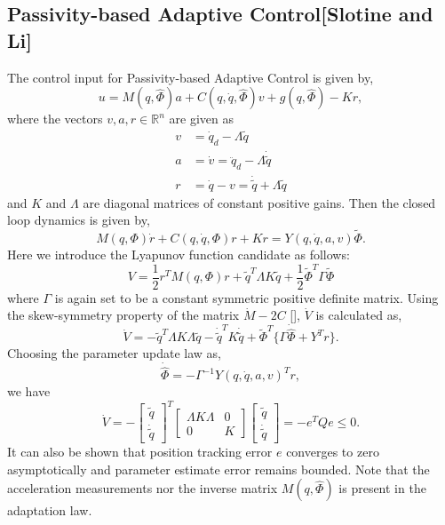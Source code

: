 \documentclass[Afour,sageh,times]{sagej}
\begin{document}
\subsection{Passivity-based Adaptive Control[Slotine and Li]}
The control input for Passivity-based Adaptive Control is given by,
\begin{equation*}
u = M(q,\hat{\Phi})a + C(q,\dot{q},\hat{\Phi})v + g(q,\hat{\Phi})-Kr,
\end{equation*}
where the vectors $v,a,r\in\mathbb{R}^{n}$ are given as
\begin{align*}
v &= \dot{q}_{d}-\Lambda\tilde{q}\\
a &= \dot{v} = \ddot{q}_{d}-\Lambda\dot{\tilde{q}}\\
r &= \dot{q}-v = \dot{\tilde{q}}+\Lambda\tilde{q}
\end{align*}
and $K$ and $\Lambda$ are diagonal matrices of constant positive gains. Then the closed loop dynamics is given by,
\begin{equation*}
M(q,\Phi)\dot{r} + C(q,\dot{q},\Phi)r+Kr = Y(q,\dot{q},a,v)\tilde{\Phi}.
\end{equation*}
Here we introduce the Lyapunov function candidate as follows:
\begin{equation}
V = \frac{1}{2}r^{T}M(q,\Phi)r + \tilde{q}^{T}\Lambda K\tilde{q}+\frac{1}{2}\tilde{\Phi}^{T}\Gamma\tilde{\Phi} \label{Slotine_lyapunov}
\end{equation}
where $\Gamma$ is again set to be a constant symmetric positive definite matrix.
Using the skew-symmetry property of the matrix $\dot{M} - 2C$ [], $\dot{V}$ is calculated as,
\begin{equation*}
\dot{V} = -\tilde{q}^{T}\Lambda K \Lambda\tilde{q} - \dot{\tilde{q}}^{T}K\dot{\tilde{q}} + \tilde{\Phi}^{T}\{\Gamma\dot{\hat{\Phi}} + Y^{T}r\}.
\end{equation*}
Choosing the parameter update law as,
\begin{equation}
\dot{\hat{\Phi}} = -\Gamma^{-1}Y(q,\dot{q},a,v)^{T}r, \label{PBAC_parameter_update}
\end{equation}
we have
\begin{equation*}
\dot{V} = -\left[\begin{array}{c} \tilde{q} \\ \dot{\tilde{q}}\end{array}\right]^{T}\left[\begin{array}{cc} \Lambda K \Lambda & 0 \\ 0 & K \end{array}\right]\left[\begin{array}{c} \tilde{q} \\ \dot{\tilde{q}}\end{array}\right] = -e^{T}Qe \leq 0.
\end{equation*}
It can also be shown that position tracking error $e$ converges to zero asymptotically and parameter estimate error remains bounded. Note that the acceleration measurements nor the inverse matrix $M(q,\hat{\Phi})$ is present in the adaptation law.
\end{document}
